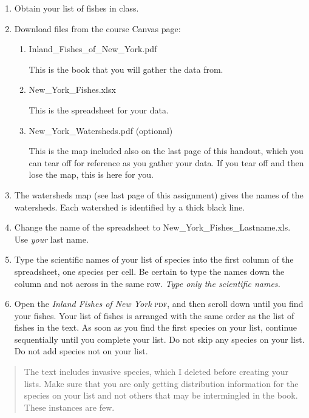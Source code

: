 \documentclass[12pt]{exam}
\begin{document}
\begin{enumerate}
\item
  Obtain your list of fishes in class.
\item
  Download files from the course Canvas page:

  \begin{enumerate}
  \def\labelenumii{\arabic{enumii}.}
  \item 
  	Inland\_Fishes\_of\_New\_York.pdf
  	
  	This is the book that you will gather the data from.
  \item
    New\_York\_Fishes.xlsx
    
    This is the spreadsheet for your data.
    
  \item
    New\_York\_Watersheds.pdf (optional)
    
    This is the map included also on the last page of this handout, which you can tear off for reference as you gather your data. 
    If you tear off and then lose the map, this is here for you.
    
  \end{enumerate}
\item
  The watersheds map (see last page of this assignment) gives 
  the names of the watersheds. Each watershed is identified by 
  a thick black line.
\item
  Change the name of the spreadsheet to New\_York\_Fishes\_Lastname.xls.
  Use \emph{your} last name.
\item
  Type the scientific names of your list of species into the first
  column of the spreadsheet, one species per cell. Be certain to 
  type the names down the column and not across in the same row. 
  \emph{Type only the scientific names.}
\item
  Open the \textit{Inland Fishes of New York} \textsc{pdf}, and then scroll down until you find your fishes. Your list of fishes is
  arranged with the same order as the list of fishes in the text. As soon as you find the first species on your list, 
  continue sequentially until you complete your list. Do not skip 
  any species on your list. Do not add species not on your list.
\end{enumerate}

\begin{quote}
The text includes invasive species, which I deleted
before creating your lists. Make sure that you are only getting
distribution information for the species on your list and not 
others that may be intermingled in the book. These instances 
are few.
\end{quote}
\end{document}
